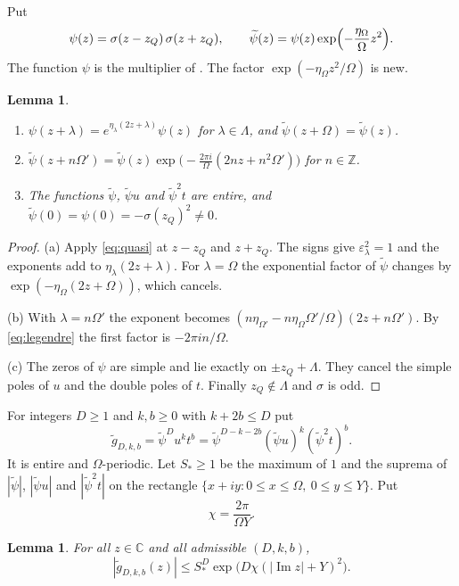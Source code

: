 \documentclass[11pt]{amsart}
\newtheorem{lemma}[theorem]{Lemma}
\theoremstyle{definition}
\theoremstyle{remark}
\numberwithin{equation}{section}
\newcommand{\Z}{\mathbb Z}
\newcommand{\C}{\mathbb C}
\newcommand{\tpsi}{\widetilde\psi}
\newcommand{\tg}{\widetilde g}
\newcommand{\CM}{\cite{ChudnovskyChudnovsky26}}
\begin{document}
Put
\[
 \psi(z)=\sigma(z-z_Q)\,\sigma(z+z_Q),\qquad \tpsi(z)=\psi(z)\exp\Bigl(-\frac{\eta_\Omega}{\Omega}z^2\Bigr).
\]
The function $\psi$ is the multiplier of \CM. The factor $\exp(-\eta_\Omega z^2/\Omega)$ is new.

\begin{lemma}\label{lem:mult}
\begin{enumerate}[label=(\alph*)]
\item $\psi(z+\lambda)=e^{\eta_\lambda(2z+\lambda)}\psi(z)$ for $\lambda\in\Lambda$, and
 $\tpsi(z+\Omega)=\tpsi(z)$.
\item $\tpsi(z+n\Omega')=\tpsi(z)\exp\bigl(-\tfrac{2\pi i}{\Omega}(2nz+n^2\Omega')\bigr)$ for $n\in\Z$.
\item The functions $\tpsi$, $\tpsi u$ and $\tpsi^2t$ are entire, and $\tpsi(0)=\psi(0)=-\sigma(z_Q)^2\ne0$.
\end{enumerate}
\end{lemma}

\begin{proof}
(a) Apply \eqref{eq:quasi} at $z-z_Q$ and $z+z_Q$. The signs give $\varepsilon_\lambda^2=1$ and the exponents add
to $\eta_\lambda(2z+\lambda)$. For $\lambda=\Omega$ the exponential factor of $\tpsi$ changes by
$\exp(-\eta_\Omega(2z+\Omega))$, which cancels.

(b) With $\lambda=n\Omega'$ the exponent becomes
$(n\eta_{\Omega'}-n\eta_\Omega\Omega'/\Omega)(2z+n\Omega')$. By \eqref{eq:legendre} the first factor is
$-2\pi in/\Omega$.

(c) The zeros of $\psi$ are simple and lie exactly on $\pm z_Q+\Lambda$. They cancel the simple poles of $u$ and
the double poles of $t$. Finally $z_Q\notin\Lambda$ and $\sigma$ is odd.
\end{proof}

For integers $D\ge1$ and $k,b\ge0$ with $k+2b\le D$ put
\[
 \tg_{D,k,b}=\tpsi^{D}u^kt^b=\tpsi^{D-k-2b}(\tpsi u)^k(\tpsi^2t)^b.
\]
It is entire and $\Omega$-periodic. Let $S_*\ge1$ be the maximum of $1$ and the suprema of $|\tpsi|$,
$|\tpsi u|$ and $|\tpsi^2t|$ on the rectangle $\{x+iy:0\le x\le\Omega,\ 0\le y\le Y\}$. Put
\[
 \chi=\frac{2\pi}{\Omega Y}.
\]

\begin{lemma}\label{lem:growth}
For all $z\in\C$ and all admissible $(D,k,b)$,
\[
 |\tg_{D,k,b}(z)|\le S_*^D\exp\bigl(D\chi(|\operatorname{Im}z|+Y)^2\bigr).
\]
\end{lemma}
\end{document}
